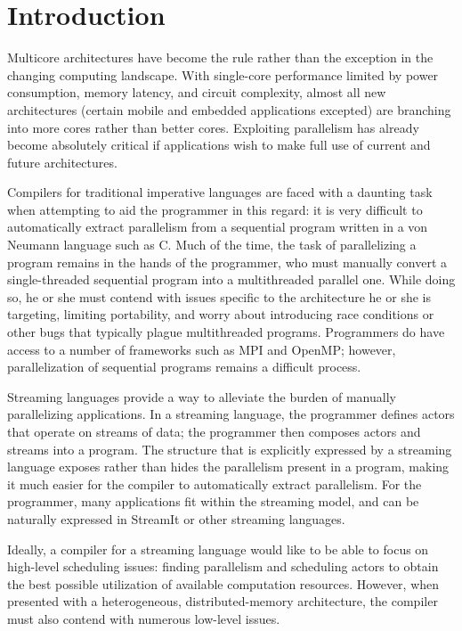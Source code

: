 \section{Introduction}

Multicore architectures have become the rule rather than the exception in the changing computing landscape. With single-core performance limited by power consumption, memory latency, and circuit complexity, almost all new architectures (certain mobile and embedded applications excepted) are branching into more cores rather than better cores. Exploiting parallelism has already become absolutely critical if applications wish to make full use of current and future architectures.

Compilers for traditional imperative languages are faced with a daunting task when attempting to aid the programmer in this regard: it is very difficult to automatically extract parallelism from a sequential program written in a von Neumann language such as C. Much of the time, the task of parallelizing a program remains in the hands of the programmer, who must manually convert a single-threaded sequential program into a multithreaded parallel one. While doing so, he or she must contend with issues specific to the architecture he or she is targeting, limiting portability, and worry about introducing race conditions or other bugs that typically plague multithreaded programs. Programmers do have access to a number of frameworks such as MPI and OpenMP; however, parallelization of sequential programs remains a difficult process.

Streaming languages provide a way to alleviate the burden of manually parallelizing applications. In a streaming language, the programmer defines actors that operate on streams of data; the programmer then composes actors and streams into a program. The structure that is explicitly expressed by a streaming language exposes rather than hides the parallelism present in a program, making it much easier for the compiler to automatically extract parallelism. For the programmer, many applications fit within the streaming model, and can be naturally expressed in StreamIt or other streaming languages.

Ideally, a compiler for a streaming language would like to be able to focus on high-level scheduling issues: finding parallelism and scheduling actors to obtain the best possible utilization of available computation resources. However, when presented with a heterogeneous, distributed-memory architecture, the compiler must also contend with numerous low-level issues.

